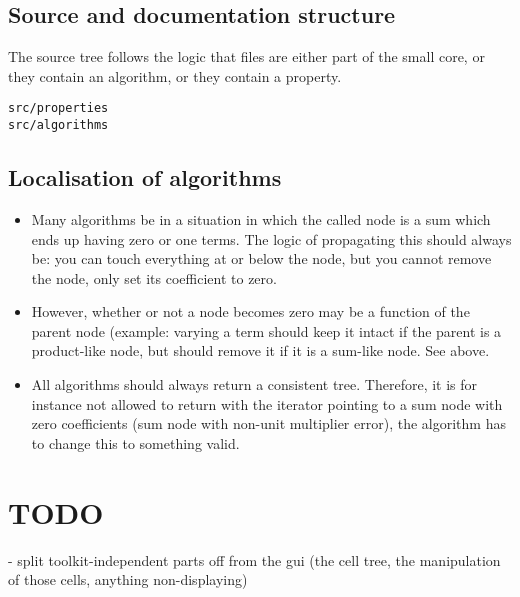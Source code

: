 \documentclass[11pt]{article}
\begin{document}
\subsection{Source and documentation structure}

The source tree follows the logic that files are either part of the
small core, or they contain an algorithm, or they contain a property. 
\begin{verbatim}
src/properties
src/algorithms
\end{verbatim}

\subsection{Localisation of algorithms}

\begin{itemize}
\item Many algorithms be in a situation in which the called
  node is a sum which ends up having zero or one terms. The logic of
  propagating this should always be: you can touch everything at or
  below the node, but you cannot remove the node, only set its
  coefficient to zero. 

\item However, whether or not a node becomes zero may be a function of
  the parent node (example: varying a term should keep it intact if
  the parent is a product-like node, but should remove it if it is a
  sum-like node. See above.

\item All algorithms should always return a consistent
  tree. Therefore, it is for instance not allowed to return with the
  iterator pointing to a sum node with zero coefficients (sum node
  with non-unit multiplier error), the algorithm has to change this to
  something valid.

\end{itemize}


\section{TODO}

- split toolkit-independent parts off from the gui (the cell tree,
  the manipulation of those cells, anything non-displaying)


% 
% 
% 
% 
\end{document}
